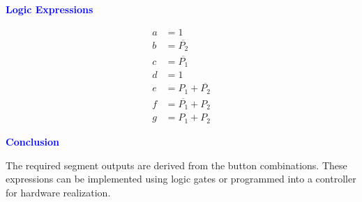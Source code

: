 \documentclass[a4paper,12pt]{article}
\newcommand{\bluehead}[1]{\textcolor{blue}{\textbf{#1}}}
\begin{document}
\vspace{0.6cm}

\bluehead{Logic Expressions}

\[
\begin{aligned}
a &= 1 \\
b &= \overline{P_2} \\
c &= \overline{P_1} \\
d &= 1 \\
e &= P_1 + \overline{P_2} \\
f &= \overline{P_1} + P_2 \\
g &= P_1 + P_2
\end{aligned}
\]

\vspace{0.6cm}

\bluehead{Conclusion}

The required segment outputs are derived from the button combinations.
These expressions can be implemented using logic gates or programmed
into a controller for hardware realization.
\end{document}
